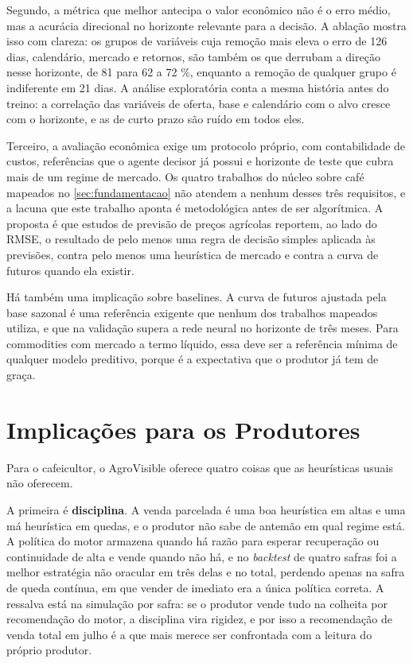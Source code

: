 Segundo, a métrica que melhor antecipa o valor econômico não é o erro médio, mas a acurácia direcional no horizonte relevante para a decisão. A ablação mostra isso com clareza: os grupos de variáveis cuja remoção mais eleva o erro de 126 dias, calendário, mercado e retornos, são também os que derrubam a direção nesse horizonte, de 81 para 62 a 72 \%, enquanto a remoção de qualquer grupo é indiferente em 21 dias. A análise exploratória conta a mesma história antes do treino: a correlação das variáveis de oferta, base e calendário com o alvo cresce com o horizonte, e as de curto prazo são ruído em todos eles.

Terceiro, a avaliação econômica exige um protocolo próprio, com contabilidade de custos, referências que o agente decisor já possui e horizonte de teste que cubra mais de um regime de mercado. Os quatro trabalhos do núcleo sobre café mapeados no \autoref{sec:fundamentacao} não atendem a nenhum desses três requisitos, e a lacuna que este trabalho aponta é metodológica antes de ser algorítmica. A proposta é que estudos de previsão de preços agrícolas reportem, ao lado do RMSE, o resultado de pelo menos uma regra de decisão simples aplicada às previsões, contra pelo menos uma heurística de mercado e contra a curva de futuros quando ela existir.

Há também uma implicação sobre baselines. A curva de futuros ajustada pela base sazonal é uma referência exigente que nenhum dos trabalhos mapeados utiliza, e que na validação supera a rede neural no horizonte de três meses. Para commodities com mercado a termo líquido, essa deve ser a referência mínima de qualquer modelo preditivo, porque é a expectativa que o produtor já tem de graça.

\section{Implicações para os Produtores}\label{sec2:disc-produtores}

Para o cafeicultor, o AgroVisible oferece quatro coisas que as heurísticas usuais não oferecem.

A primeira é \textbf{disciplina}. A venda parcelada é uma boa heurística em altas e uma má heurística em quedas, e o produtor não sabe de antemão em qual regime está. A política do motor armazena quando há razão para esperar recuperação ou continuidade de alta e vende quando não há, e no \textit{backtest} de quatro safras foi a melhor estratégia não oracular em três delas e no total, perdendo apenas na safra de queda contínua, em que vender de imediato era a única política correta. A ressalva está na simulação por safra: se o produtor vende tudo na colheita por recomendação do motor, a disciplina vira rigidez, e por isso a recomendação de venda total em julho é a que mais merece ser confrontada com a leitura do próprio produtor.

